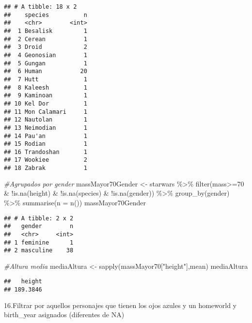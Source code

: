 \documentclass[
]{book}
\newenvironment{Shaded}{\begin{snugshade}}{\end{snugshade}}
\newcommand{\AttributeTok}[1]{\textcolor[rgb]{0.77,0.63,0.00}{#1}}
\newcommand{\CommentTok}[1]{\textcolor[rgb]{0.56,0.35,0.01}{\textit{#1}}}
\newcommand{\DecValTok}[1]{\textcolor[rgb]{0.00,0.00,0.81}{#1}}
\newcommand{\FunctionTok}[1]{\textcolor[rgb]{0.00,0.00,0.00}{#1}}
\newcommand{\NormalTok}[1]{#1}
\newcommand{\OtherTok}[1]{\textcolor[rgb]{0.56,0.35,0.01}{#1}}
\newcommand{\SpecialCharTok}[1]{\textcolor[rgb]{0.00,0.00,0.00}{#1}}
\newcommand{\StringTok}[1]{\textcolor[rgb]{0.31,0.60,0.02}{#1}}
\begin{document}
\begin{verbatim}
## # A tibble: 18 x 2
##    species          n
##    <chr>        <int>
##  1 Besalisk         1
##  2 Cerean           1
##  3 Droid            2
##  4 Geonosian        1
##  5 Gungan           1
##  6 Human           20
##  7 Hutt             1
##  8 Kaleesh          1
##  9 Kaminoan         1
## 10 Kel Dor          1
## 11 Mon Calamari     1
## 12 Nautolan         1
## 13 Neimodian        1
## 14 Pau'an           1
## 15 Rodian           1
## 16 Trandoshan       1
## 17 Wookiee          2
## 18 Zabrak           1
\end{verbatim}

\begin{Shaded}
\begin{Highlighting}[]
\CommentTok{\#Agrupados por gender}
\NormalTok{massMayor70Gender }\OtherTok{\textless{}{-}}\NormalTok{ starwars }\SpecialCharTok{\%\textgreater{}\%} \FunctionTok{filter}\NormalTok{(mass}\SpecialCharTok{\textgreater{}=}\DecValTok{70} \SpecialCharTok{\&} \SpecialCharTok{!}\FunctionTok{is.na}\NormalTok{(height) }\SpecialCharTok{\&} \SpecialCharTok{!}\FunctionTok{is.na}\NormalTok{(species) }\SpecialCharTok{\&} \SpecialCharTok{!}\FunctionTok{is.na}\NormalTok{(gender)) }\SpecialCharTok{\%\textgreater{}\%} \FunctionTok{group\_by}\NormalTok{(gender) }\SpecialCharTok{\%\textgreater{}\%} \FunctionTok{summarise}\NormalTok{(}\AttributeTok{n =} \FunctionTok{n}\NormalTok{()) }
\NormalTok{massMayor70Gender}
\end{Highlighting}
\end{Shaded}

\begin{verbatim}
## # A tibble: 2 x 2
##   gender        n
##   <chr>     <int>
## 1 feminine      1
## 2 masculine    38
\end{verbatim}

\begin{Shaded}
\begin{Highlighting}[]
\CommentTok{\#Altura media}
\NormalTok{mediaAltura }\OtherTok{\textless{}{-}} \FunctionTok{sapply}\NormalTok{(massMayor70[}\StringTok{"height"}\NormalTok{],mean)}
\NormalTok{mediaAltura}
\end{Highlighting}
\end{Shaded}

\begin{verbatim}
##   height 
## 189.3846
\end{verbatim}

16.Filtrar por aquellos personajes que tienen los ojos azules y un homeworld y birth\_year asignados (diferentes de NA)
\end{document}
